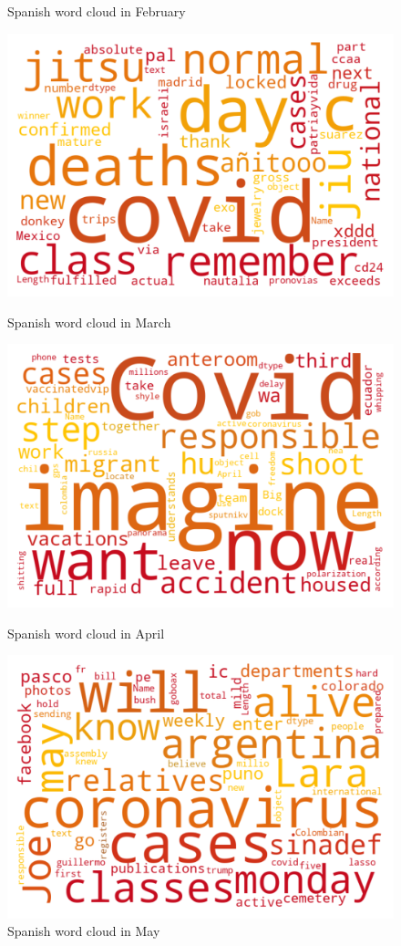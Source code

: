 \begin{landscape}
\begin{figure}[!htb]
  \caption{Spanish word cloud in February}\label{fig:februaryes}
\endminipage
\end{figure}
\begin{figure}[!htb]
  \includegraphics[width=\linewidth]{March es word cloud.png}
  \caption{Spanish word cloud in March}\label{fig:marches}
\endminipage\hfill
{}
  \includegraphics[width=\linewidth]{April es word cloud.png}
  \caption{Spanish word cloud in April}\label{fig:apriles}
\endminipage\hfill
{}
  \includegraphics[width=\linewidth]{May es word cloud.png}
  \caption{Spanish word cloud in May}\label{fig:mayes}
\endminipage
\end{figure}


\end{landscape}
